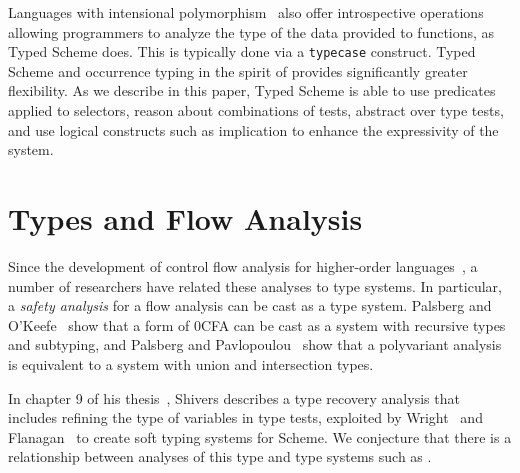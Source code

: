 Languages with intensional polymorphism~\cite{weirich98} also offer
introspective operations allowing programmers to analyze the type of
the data provided to functions, as Typed Scheme does. This is
typically done via a \texttt{typecase} construct.  Typed Scheme and
occurrence typing in the spirit of \lts 
provides significantly greater flexibility.  As we
describe in this paper, Typed Scheme is able to use predicates applied
to selectors, reason about combinations of tests, abstract over type
tests, and use logical constructs such as implication to enhance the
expressivity of the system.  

\section{Types and Flow Analysis}

Since the development of control flow analysis for higher-order
languages~\cite{shivers-thesis}, a number of researchers have related
these analyses to type systems.  In particular, a \emph{safety
  analysis} for a flow analysis can be cast as a type system. Palsberg
and O'Keefe~\cite{palsberg95} show that a form of 0CFA can be cast as
a system with recursive types and subtyping, and Palsberg and
Pavlopoulou~\cite{palsberg01} show that a polyvariant analysis is
equivalent to a system with union and intersection types.  

In chapter
9 of his thesis~\cite{shivers-thesis}, Shivers describes a type
recovery analysis that includes refining the type of variables in type
tests, exploited by Wright~\cite{aw:soft-typing} and 
Flanagan~\cite{cf:static-debugging} to create soft typing systems for Scheme.  
  We conjecture that there is a relationship between analyses of
this type and type systems such as \lts.  


